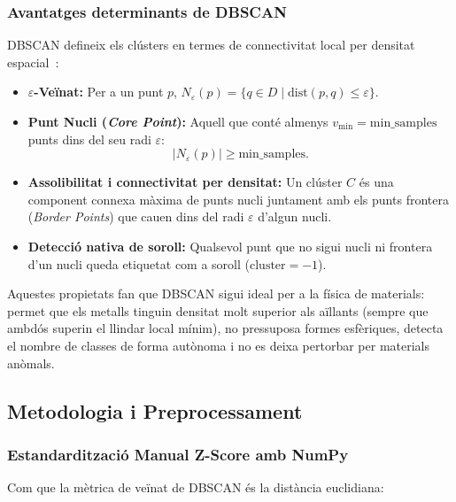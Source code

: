 \documentclass[a4paper,11pt]{article}
\begin{document}
\subsubsection{Avantatges determinants de DBSCAN}

DBSCAN defineix els clústers en termes de connectivitat local per densitat espacial~\cite{ester1996, gfg_dbscan}:
\begin{itemize}
    \item \textbf{$\varepsilon$-Veïnat:} Per a un punt $p$, $N_\varepsilon(p) = \{q \in D \mid \mathrm{dist}(p, q) \le \varepsilon\}$.
    \item \textbf{Punt Nucli (\emph{Core Point}):} Aquell que conté almenys $v_{\min} = \text{min\_samples}$ punts dins del seu radi $\varepsilon$:
    \begin{equation}
        |N_\varepsilon(p)| \ge \text{min\_samples}.
    \end{equation}
    \item \textbf{Assolibilitat i connectivitat per densitat:} Un clúster $C$ és una component connexa màxima de punts nucli juntament amb els punts frontera (\emph{Border Points}) que cauen dins del radi $\varepsilon$ d'algun nucli.
    \item \textbf{Detecció nativa de soroll:} Qualsevol punt que no sigui nucli ni frontera d'un nucli queda etiquetat com a soroll ($\text{cluster} = -1$).
\end{itemize}

Aquestes propietats fan que DBSCAN sigui ideal per a la física de materials: permet que els metalls tinguin densitat molt superior als aïllants (sempre que ambdós superin el llindar local mínim), no pressuposa formes esfèriques, detecta el nombre de classes de forma autònoma i no es deixa pertorbar per materials anòmals.

\subsection{Metodologia i Preprocessament}

\subsubsection{Estandardització Manual Z-Score amb NumPy}

Com que la mètrica de veïnat de DBSCAN és la distància euclidiana:
\end{document}
